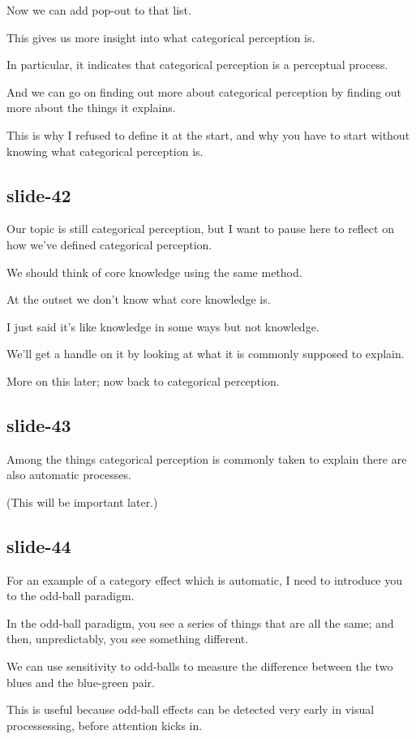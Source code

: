 \documentclass[12pt,\papersize]{extarticle}
\begin{document}
Now we can add pop-out to that list.
 
This gives us more insight into what categorical perception is.
 
In particular, it indicates that categorical perception is a perceptual process.
 
And we can go on finding out more about categorical perception by finding out more about the things it explains.
 
This is why I refused to define it at the start, and why you have to start without knowing what categorical perception is.
 
\subsection{slide-42}
Our topic is still categorical perception, but I want to pause here to reflect on how we've defined categorical perception.
 
We should think of core knowledge using the same method.
 
At the outset we don't know what core knowledge is.
 
I just said it's like knowledge in some ways but not knowledge.
 
We'll get a handle on it by looking at what it is commonly supposed to explain.
 
More on this later; now back to categorical perception.
 
\subsection{slide-43}
Among the things categorical perception is commonly taken to explain there are also automatic processes.
 
(This will be important later.)
 
\subsection{slide-44}
For an example of a category effect which is automatic, I need to introduce you to the odd-ball paradigm.
 
In the odd-ball paradigm, you see a series of things that are all the same; and then, unpredictably, you see something different.
 
We can use sensitivity to odd-balls to measure the difference between the two blues and the blue-green pair.
 
This is useful because odd-ball effects can be detected very early in visual processessing, before attention kicks in.
 
\end{document}
